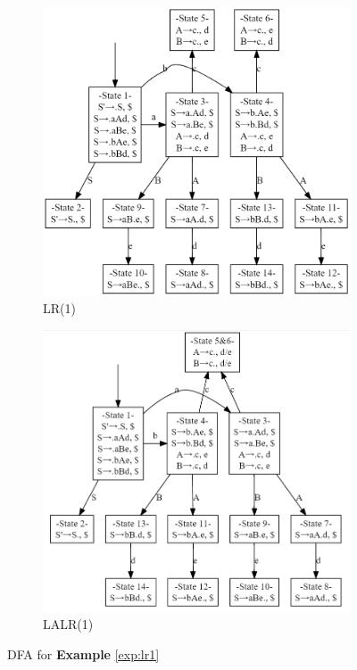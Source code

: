 \begin{figure}[H]
    \centering
    \begin{subfigure}{0.48\linewidth}
        \centering
        \includegraphics[width=0.88\linewidth]{pic/CP3/explr1dfa.png}
        \caption{LR(1)}
        \label{fig:explr1}
    \end{subfigure}
    \begin{subfigure}{0.48\linewidth}
        \centering
        \includegraphics[width=0.88\linewidth]{pic/CP3/explalr1dfa.png}
        \caption{LALR(1)}
    \end{subfigure}
    \caption{DFA for \textbf{Example} \ref{exp:lr1}}
\end{figure}


